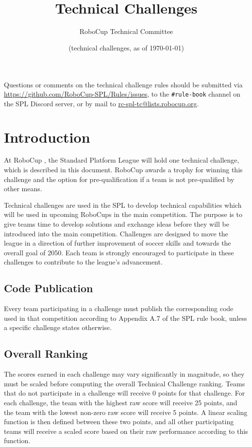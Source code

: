 \documentclass[12pt]{article}
\title{\leaguename\\Technical Challenges}
\author{RoboCup Technical Committee}
\date{(\RCYear technical challenges, as of \today)}
\begin{document}
\maketitle

\begin{center}
Questions or comments on the technical challenge rules should be submitted via \url{https://github.com/RoboCup-SPL/Rules/issues}, to the \texttt{\#rule-book} channel on the SPL Discord server, or by mail to \url{rc-spl-tc@lists.robocup.org}.
\end{center}

\newpage

\tableofcontents
\setcounter{tocdepth}{3}

\thispagestyle{fancy}

\clearpage

\cfoot{\thepage}
\setcounter{page}{1}

\section{Introduction}
At RoboCup \RCYear, the Standard Platform League will hold one technical challenge, which is described in this document.
RoboCup \RCYear awards a trophy for winning this challenge and the option for pre-qualification if a team is not pre-qualified by other means.

Technical challenges are used in the SPL to develop technical capabilities which will be used in upcoming RoboCups in the main competition. The purpose is to give teams time to develop solutions and exchange ideas before they will be introduced into the main competition. Challenges are designed to move the league in a direction of further improvement of soccer skills and towards the overall goal of 2050. Each team is strongly encouraged to participate in these challenges to contribute to the league's advancement.

\subsection{Code Publication}
Every team participating in a challenge must publish the corresponding code used in that competition according to Appendix A.7 of the SPL rule book, unless a specific challenge states otherwise.

\subsection{Overall Ranking}
The scores earned in each challenge may vary significantly in magnitude, so they must be scaled before computing the overall Technical Challenge ranking.
Teams that do not participate in a challenge will receive 0 points for that challenge.
For each challenge, the team with the highest raw score will receive 25 points, and the team with the lowest non-zero raw score will receive 5 points.
A linear scaling function is then defined between these two points, and all other participating teams will receive a scaled score based on their raw performance according to this function.



\end{document}
